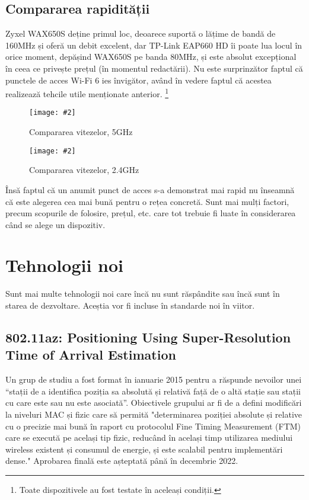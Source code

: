 \documentclass[a4paper,12pt]{report}
\def\oldchapter{} \let\oldchapter=\chapter{}
\def\chapter{\stepcounter{num_chapters}\oldchapter}
\newcommand{\centeredImageWithCaption}[2]{%
  \begin{figure}[H]
    \caption{#1}
    \texttt{[image: \#2]}
    \centering
  \end{figure}}
\begin{document}
\section{Compararea rapidității}

\cite{standards_ieee802_11_timeline}

Zyxel WAX650S deține primul loc, deoarece suportă o lățime de bandă de 160MHz și oferă un debit excelent, dar TP-Link EAP660 HD îi poate lua locul în orice moment, depășind WAX650S pe banda 80MHz, și este absolut excepțional în ceea ce privește prețul (în momentul redactării).
Nu este surprinzător faptul că punctele de acces Wi-Fi 6 ies învigător, având în vedere faptul că acestea realizează tehcile utile menționate anterior. \footnote{Toate dispozitivele au fost testate în aceleași condiții.}

\centeredImageWithCaption{Compararea vitezelor, 5GHz}{best-wireless-access-points-1-re-new.jpg}

\centeredImageWithCaption{Compararea vitezelor, 2.4GHz}{best-wireless-access-points-2-re-new.jpg}


Însă faptul că un anumit punct de acces s-a demonstrat mai rapid nu înseamnă că este alegerea cea mai bună pentru o rețea concretă. Sunt mai mulți factori, precum scopurile de folosire, prețul, etc. care tot trebuie fi luate în considerarea când se alege un dispozitiv.


\chapter{Tehnologii noi}

Sunt mai multe tehnologii noi care încă nu sunt răspândite sau încă sunt în starea de dezvoltare.
Aceștia vor fi incluse în standarde noi în viitor.

\section{802.11az: Positioning Using Super-Resolution Time of Arrival Estimation}

Un grup de studiu a fost format în ianuarie 2015 pentru a răspunde nevoilor unei ``stații de a identifica poziția sa absolută și relativă față de o altă stație sau stații cu care este sau nu este asociată''.
Obiectivele grupului ar fi de a defini modificări la niveluri MAC și fizic care să permită "determinarea poziției absolute și relative cu o precizie mai bună în raport cu protocolul Fine Timing Measurement (FTM) care se execută pe același tip fizic, reducând în același timp utilizarea mediului wireless existent și consumul de energie, și este scalabil pentru implementări dense."
Aprobarea finală este așteptată până în decembrie 2022.
\end{document}
